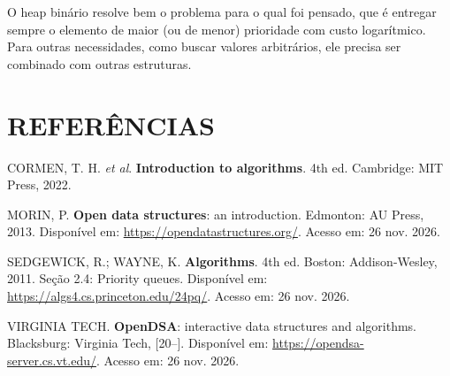 \documentclass[12pt,openany,oneside,a4paper,english,brazil,sumario=tradicional]{abntex2}
\begin{document}
O heap binário resolve bem o problema para o qual foi pensado, que é entregar sempre o elemento de maior (ou de menor) prioridade com custo logarítmico. Para outras necessidades, como buscar valores arbitrários, ele precisa ser combinado com outras estruturas.

\postextual

\chapter*[REFERÊNCIAS]{REFERÊNCIAS}

\begin{SingleSpace}
\raggedright
\setlength{\parindent}{0pt}
\setlength{\parskip}{12pt}

CORMEN, T. H. \emph{et al}. \textbf{Introduction to algorithms}. 4th ed. Cambridge: MIT Press, 2022.

MORIN, P. \textbf{Open data structures}: an introduction. Edmonton: AU Press, 2013. Disponível em: \url{https://opendatastructures.org/}. Acesso em: 26 nov. 2026.

SEDGEWICK, R.; WAYNE, K. \textbf{Algorithms}. 4th ed. Boston: Addison-Wesley, 2011. Seção 2.4: Priority queues. Disponível em: \url{https://algs4.cs.princeton.edu/24pq/}. Acesso em: 26 nov. 2026.

VIRGINIA TECH. \textbf{OpenDSA}: interactive data structures and algorithms. Blacksburg: Virginia Tech, [20--]. Disponível em: \url{https://opendsa-server.cs.vt.edu/}. Acesso em: 26 nov. 2026.

\end{SingleSpace}
\end{document}
